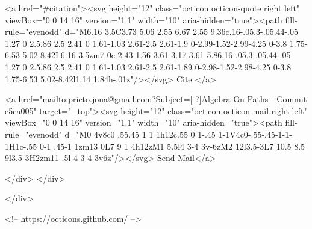       <a  href="#citation"><svg height="12" class="octicon octicon-quote right left" viewBox="0 0 14 16" version="1.1" width="10" aria-hidden="true"><path fill-rule="evenodd" d="M6.16 3.5C3.73 5.06 2.55 6.67 2.55 9.36c.16-.05.3-.05.44-.05 1.27 0 2.5.86 2.5 2.41 0 1.61-1.03 2.61-2.5 2.61-1.9 0-2.99-1.52-2.99-4.25 0-3.8 1.75-6.53 5.02-8.42L6.16 3.5zm7 0c-2.43 1.56-3.61 3.17-3.61 5.86.16-.05.3-.05.44-.05 1.27 0 2.5.86 2.5 2.41 0 1.61-1.03 2.61-2.5 2.61-1.89 0-2.98-1.52-2.98-4.25 0-3.8 1.75-6.53 5.02-8.42l1.14 1.84h-.01z"/></svg> Cite
      </a>

      <a href="mailto:prieto.jona@gmail.com?Subject=[ ?]Algebra On Paths - Commit e5ca005" target="_top"><svg height="12" class="octicon octicon-mail right left" viewBox="0 0 14 16" version="1.1" width="10" aria-hidden="true"><path fill-rule="evenodd" d="M0 4v8c0 .55.45 1 1 1h12c.55 0 1-.45 1-1V4c0-.55-.45-1-1-1H1c-.55 0-1 .45-1 1zm13 0L7 9 1 4h12zM1 5.5l4 3-4 3v-6zM2 12l3.5-3L7 10.5 8.5 9l3.5 3H2zm11-.5l-4-3 4-3v6z"/></svg> Send Mail</a>

    </div>
  </div>

</div>

<!-- https://octicons.github.com/ -->





